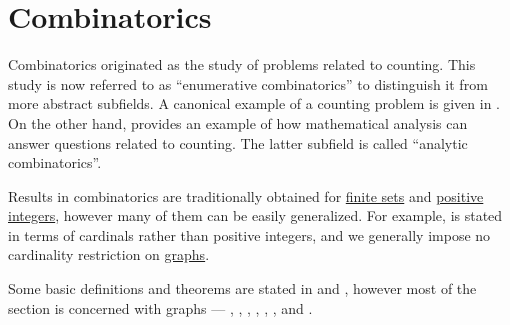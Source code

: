 \section{Combinatorics}\label{sec:combinatorics}

Combinatorics originated as the study of problems related to counting. This study is now referred to as \enquote{enumerative combinatorics} to distinguish it from more abstract subfields. A canonical example of a counting problem is given in . On the other hand,  provides an example of how mathematical analysis can answer questions related to counting. The latter subfield is called \enquote{analytic combinatorics}.

Results in combinatorics are traditionally obtained for \hyperref[def:set_finiteness]{finite sets} and \hyperref[def:integer_signum]{positive integers}, however many of them can be easily generalized. For example,  is stated in terms of cardinals rather than positive integers, and we generally impose no cardinality restriction on \hyperref[def:directed_graph]{graphs}.

Some basic definitions and theorems are stated in  and , however most of the section is concerned with graphs --- , , , , , ,  and .

